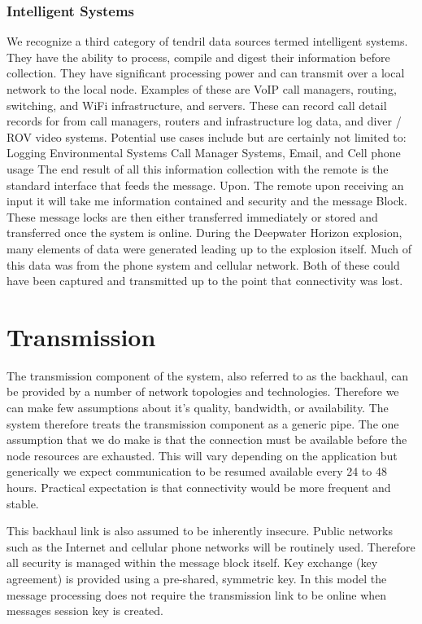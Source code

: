 \subsubsection{Intelligent Systems}
We recognize a third category of tendril data sources termed intelligent systems. They have the ability to process, compile and digest their information before collection. They have significant processing power and can transmit over a local network to the local node.  
Examples of these are VoIP call managers, routing, switching, and WiFi infrastructure, and servers.  These can record call detail records for from call managers, routers and infrastructure log data, and diver / ROV  \cite{Christ:2011vn} video systems.
Potential use cases include but are certainly not limited to: Logging Environmental Systems Call Manager Systems, Email, and Cell phone usage
The end result of all this information collection with the remote is the standard interface that feeds the message. Upon. The remote upon receiving an input it will take me information contained and security and the message Block. These message locks are then either transferred immediately or stored and transferred once the system is online.
During the Deepwater Horizon explosion, many elements of data were generated leading up to the explosion itself. 
Much of this data was from the phone system and cellular network. Both of these could have been captured and transmitted up to the point that connectivity was lost. 

\section{Transmission}
The transmission component of the system, also referred to as the backhaul, can be provided by a number of network topologies and technologies. Therefore we can make few assumptions about it’s quality, bandwidth, or availability. The system therefore treats the transmission component as a generic pipe. The one assumption that we do make is that the connection must be available before the node resources are exhausted. This will vary depending on the application but generically we expect communication to be resumed available every 24 to 48 hours. Practical expectation is that connectivity would be more frequent and stable.

This backhaul link is also assumed to be inherently insecure. Public networks such as the Internet and cellular phone networks will be routinely used. Therefore all security is managed within the message block itself. Key exchange (key agreement) is provided using a pre-shared, symmetric key. In this model the message processing does not require the transmission link to be online when messages session key is created.


